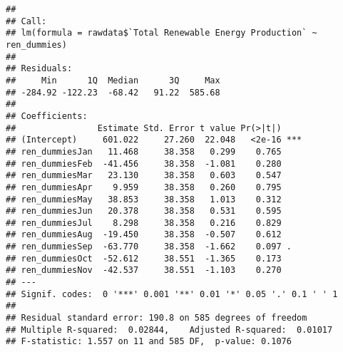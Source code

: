 \documentclass[
]{article}
\newenvironment{Shaded}{\begin{snugshade}}{\end{snugshade}}
\newcommand{\AttributeTok}[1]{\textcolor[rgb]{0.77,0.63,0.00}{#1}}
\newcommand{\CommentTok}[1]{\textcolor[rgb]{0.56,0.35,0.01}{\textit{#1}}}
\newcommand{\DecValTok}[1]{\textcolor[rgb]{0.00,0.00,0.81}{#1}}
\newcommand{\DocumentationTok}[1]{\textcolor[rgb]{0.56,0.35,0.01}{\textbf{\textit{#1}}}}
\newcommand{\FunctionTok}[1]{\textcolor[rgb]{0.00,0.00,0.00}{#1}}
\newcommand{\NormalTok}[1]{#1}
\newcommand{\OtherTok}[1]{\textcolor[rgb]{0.56,0.35,0.01}{#1}}
\newcommand{\SpecialCharTok}[1]{\textcolor[rgb]{0.00,0.00,0.00}{#1}}
\newcommand{\StringTok}[1]{\textcolor[rgb]{0.31,0.60,0.02}{#1}}
\begin{document}
\begin{Shaded}
\end{Shaded}

\begin{verbatim}
## 
## Call:
## lm(formula = rawdata$`Total Renewable Energy Production` ~ ren_dummies)
## 
## Residuals:
##     Min      1Q  Median      3Q     Max 
## -284.92 -122.23  -68.42   91.22  585.68 
## 
## Coefficients:
##                Estimate Std. Error t value Pr(>|t|)    
## (Intercept)     601.022     27.260  22.048   <2e-16 ***
## ren_dummiesJan   11.468     38.358   0.299    0.765    
## ren_dummiesFeb  -41.456     38.358  -1.081    0.280    
## ren_dummiesMar   23.130     38.358   0.603    0.547    
## ren_dummiesApr    9.959     38.358   0.260    0.795    
## ren_dummiesMay   38.853     38.358   1.013    0.312    
## ren_dummiesJun   20.378     38.358   0.531    0.595    
## ren_dummiesJul    8.298     38.358   0.216    0.829    
## ren_dummiesAug  -19.450     38.358  -0.507    0.612    
## ren_dummiesSep  -63.770     38.358  -1.662    0.097 .  
## ren_dummiesOct  -52.612     38.551  -1.365    0.173    
## ren_dummiesNov  -42.537     38.551  -1.103    0.270    
## ---
## Signif. codes:  0 '***' 0.001 '**' 0.01 '*' 0.05 '.' 0.1 ' ' 1
## 
## Residual standard error: 190.8 on 585 degrees of freedom
## Multiple R-squared:  0.02844,    Adjusted R-squared:  0.01017 
## F-statistic: 1.557 on 11 and 585 DF,  p-value: 0.1076
\end{verbatim}
\end{document}
